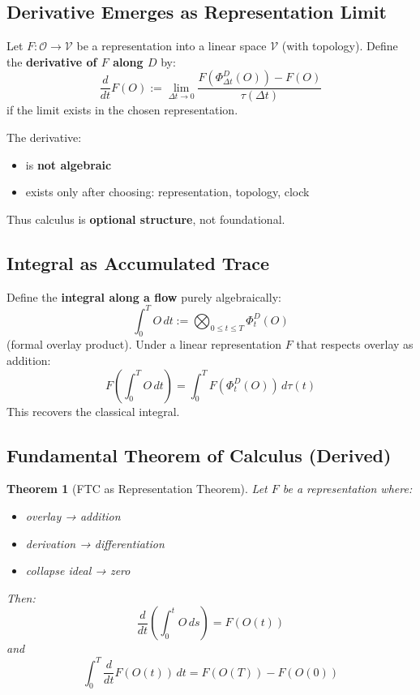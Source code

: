 \documentclass[12pt, oneside]{article}
\newtheorem{theorem}{Theorem}[section]
\newcommand{\Opr}{\mathcal{O}}
\begin{document}
\subsection{Derivative Emerges as Representation Limit}

Let $F: \Opr \rightarrow \mathcal{V}$ be a representation into a linear space $\mathcal{V}$ (with topology). Define the \textbf{derivative of $F$ along $D$} by:
\begin{equation}
\frac{d}{dt} F(O) := \lim_{\Delta t \to 0} \frac{F(\Phi_{\Delta t}^D(O)) - F(O)}{\tau(\Delta t)}
\end{equation}
if the limit exists in the chosen representation.

The derivative:
\begin{itemize}
    \item is \textbf{not algebraic}
    \item exists only after choosing: representation, topology, clock
\end{itemize}
Thus calculus is \textbf{optional structure}, not foundational.

\subsection{Integral as Accumulated Trace}

Define the \textbf{integral along a flow} purely algebraically:
\begin{equation}
\int_0^T O \, dt := \bigotimes_{0 \leq t \leq T} \Phi_t^D(O)
\end{equation}
(formal overlay product). Under a linear representation $F$ that respects overlay as addition:
\begin{equation}
F\left( \int_0^T O \, dt \right) = \int_0^T F(\Phi_t^D(O)) \, d\tau(t)
\end{equation}
This recovers the classical integral.

\subsection{Fundamental Theorem of Calculus (Derived)}

\begin{theorem}[FTC as Representation Theorem]
Let $F$ be a representation where:
\begin{itemize}
    \item overlay → addition
    \item derivation → differentiation
    \item collapse ideal → zero
\end{itemize}
Then:
\begin{equation}
\frac{d}{dt} \left( \int_0^t O \, ds \right) = F(O(t))
\end{equation}
and
\begin{equation}
\int_0^T \frac{d}{dt} F(O(t)) \, dt = F(O(T)) - F(O(0))
\end{equation}
\end{theorem}
\end{document}
